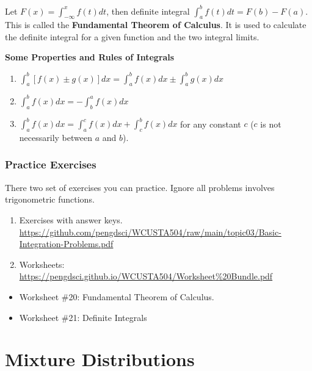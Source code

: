 \documentclass[
]{book}
\begin{document}
Let \(F(x) = \int_{-\infty}^x f(t) dt\), then definite integral \(\int_a^b f(t)dt = F(b) - F(a)\). This is called the \textbf{Fundamental Theorem of Calculus}. It is used to calculate the definite integral for a given function and the two integral limits.

\hfill\break

\textbf{Some Properties and Rules of Integrals}

\begin{enumerate}
\def\labelenumi{\arabic{enumi}.}
\item
  \(\int_a^b [f(x) \pm g(x)]dx = \int_a^b f(x)dx \pm \int_a^b g(x)dx\)
\item
  \(\int_a^b f(x)dx = -\int_b^a f(x) dx\)
\item
  \(\int_a^b f(x)dx = \int_a^c f(x)dx + \int_c^b f(x)dx\) for any constant \(c\) (\(c\) is not necessarily between \(a\) and \(b\)).
\end{enumerate}

\hfill\break

\hypertarget{practice-exercises-3}{%
\subsection{Practice Exercises}\label{practice-exercises-3}}

There two set of exercises you can practice. Ignore all problems involves trigonometric functions.

\begin{enumerate}
\def\labelenumi{\arabic{enumi}.}
\item
  Exercises with answer keys. \url{https://github.com/pengdsci/WCUSTA504/raw/main/topic03/Basic-Integration-Problems.pdf}
\item
  Worksheets: \url{https://pengdsci.github.io/WCUSTA504/Worksheet\%20Bundle.pdf}
\end{enumerate}

\begin{itemize}
\item
  Worksheet \#20: Fundamental Theorem of Calculus.
\item
  Worksheet \#21: Definite Integrals
\end{itemize}

\hfill\break

\hfill\break

\hypertarget{mixture-distributions}{%
\chapter{Mixture Distributions}\label{mixture-distributions}}
\end{document}

